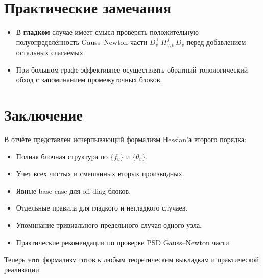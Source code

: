 \documentclass[a4paper,12pt]{article}
\begin{document}
\section{Практические замечания}
\begin{itemize}
  \item В \textbf{гладком} случае имеет смысл проверять положительную полуопределённость Gauss–Newton‐части
    $D_v^\top\,H^f_{v,v}\,D_v$ перед добавлением остальных слагаемых.
  \item При большом графе эффективнее осуществлять обратный топологический обход с запоминанием промежуточных блоков.
\end{itemize}

\section{Заключение}
В отчёте представлен исчерпывающий формализм Hessian’а второго порядка:
\begin{itemize}
  \item Полная блочная структура по $\{f_v\}$ и $\{\theta_v\}$.
  \item Учет всех чистых и смешанных вторых производных.
  \item Явные base‐case для off‐diag блоков.
  \item Отдельные правила для гладкого и негладкого случаев.
  \item Упоминание тривиального предельного случая одного узла.
  \item Практические рекомендации по проверке PSD Gauss–Newton части.
\end{itemize}
Теперь этот формализм готов к любым теоретическим выкладкам и практической реализации.
\end{document}
